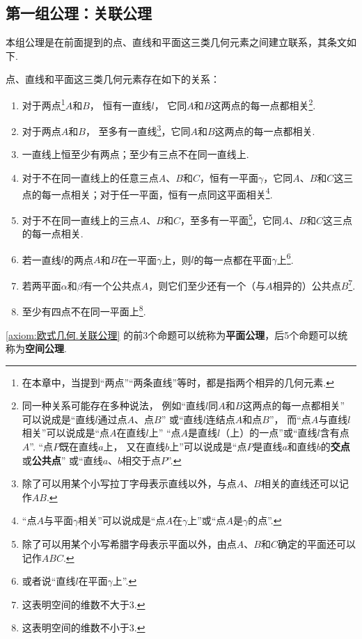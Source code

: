 \subsection{第一组公理：关联公理}
本组公理是在前面提到的点、直线和平面这三类几何元素之间建立联系，其条文如下.
\begin{axiom}[关联公理]\label{axiom:欧式几何.关联公理}
点、直线和平面这三类几何元素存在如下的关系：
\begin{enumerate}
\item 对于两点\footnote{%
在本章中，当提到“两点”“两条直线”等时，都是指两个相异的几何元素.%
}\(A\)和\(B\)，%
恒有一直线\(l\)，%
它同\(A\)和\(B\)这两点的每一点都相关\footnote{%
同一种关系可能存在多种说法，%
例如“直线\(l\)同\(A\)和\(B\)这两点的每一点都相关”
可以说成是“直线\(l\)通过点\(A\)、点\(B\)”
或“直线\(l\)连结点\(A\)和点\(B\)”，%
而“点\(A\)与直线\(l\)相关”可以说成是“点\(A\)在直线\(l\)上”
“点\(A\)是直线\(l\)（上）的一点”或“直线\(l\)含有点\(A\)”.%
“点\(P\)既在直线\(a\)上，%
又在直线\(b\)上”可以说成是“点\(P\)是直线\(a\)和直线\(b\)的\textbf{交点}或\textbf{公共点}”
或“直线\(a\)、\(b\)相交于点\(P\)”.
}.

\item 对于两点\(A\)和\(B\)，%
至多有一直线\footnote{%
除了可以用某个小写拉丁字母表示直线以外，与点\(A\)、\(B\)相关的直线还可以记作\(AB\).%
}，它同\(A\)和\(B\)这两点的每一点都相关.

\item 一直线上恒至少有两点；至少有三点不在同一直线上.

\item 对于不在同一直线上的任意三点\(A\)、\(B\)和\(C\)，恒有一平面\(\gamma\)，它同\(A\)、\(B\)和\(C\)这三点的每一点相关；对于任一平面，恒有一点同这平面相关\footnote{%
“点\(A\)与平面\(\gamma\)相关”可以说成是“点\(A\)在\(\gamma\)上”或“点\(A\)是\(\gamma\)的点”.%
}.

\item 对于不在同一直线上的三点\(A\)、\(B\)和\(C\)，至多有一平面\footnote{%
除了可以用某个小写希腊字母表示平面以外，由点\(A\)、\(B\)和\(C\)确定的平面还可以记作\(ABC\).%
}，它同\(A\)、\(B\)和\(C\)这三点的每一点相关.

\item 若一直线\(l\)的两点\(A\)和\(B\)在一平面\(\gamma\)上，则\(l\)的每一点都在平面\(\gamma\)上\footnote{%
或者说“直线\(l\)在平面\(\gamma\)上”.%
}.

\item 若两平面\(\alpha\)和\(\beta\)有一个公共点\(A\)，则它们至少还有一个（与\(A\)相异的）公共点\(B\)\footnote{%
这表明空间的维数不大于3.%
}.

\item 至少有四点不在同一平面上\footnote{%
这表明空间的维数不小于3.%
}.
\end{enumerate}
\end{axiom}
\cref{axiom:欧式几何.关联公理} 的前3个命题可以统称为\textbf{平面公理}，后5个命题可以统称为\textbf{空间公理}.

